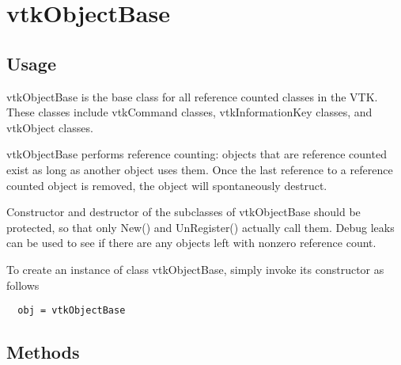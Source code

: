 \section{vtkObjectBase}

\subsection{Usage}

 vtkObjectBase is the base class for all reference counted classes
 in the VTK. These classes include vtkCommand classes, vtkInformationKey
 classes, and vtkObject classes.

 vtkObjectBase performs reference counting: objects that are
 reference counted exist as long as another object uses them. Once
 the last reference to a reference counted object is removed, the
 object will spontaneously destruct.

 Constructor and destructor of the subclasses of vtkObjectBase
 should be protected, so that only New() and UnRegister() actually
 call them. Debug leaks can be used to see if there are any objects
 left with nonzero reference count.


To create an instance of class vtkObjectBase, simply
invoke its constructor as follows
\begin{verbatim}
  obj = vtkObjectBase
\end{verbatim}
\subsection{Methods}

